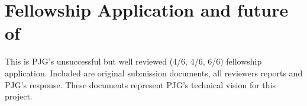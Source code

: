 
\chapter{Fellowship Application and future of \steel}
\label{Appx:HF}

This is PJG's unsuccessful but well reviewed (4/6, 4/6, 6/6) fellowship application. Included are original submission documents, all reviewers reports and PJG's response. These documents represent PJG's technical vision for this project.